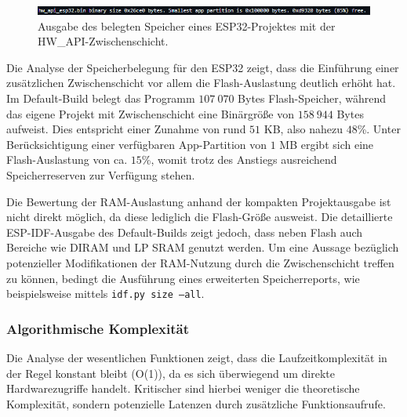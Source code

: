 \begin{figure}[H]
	\includegraphics[width=\textwidth]{Pics/esp32c6_hw_api_debug_size.png}
	\caption{Ausgabe des belegten Speicher eines ESP32-Projektes mit der HW\_API-Zwischenschicht.}
	\label{fig:esp32_hw_api_size}
\end{figure}

Die Analyse der Speicherbelegung für den ESP32 zeigt, dass die Einführung einer zusätzlichen Zwischenschicht vor allem die Flash-Auslastung deutlich erhöht hat. 
Im Default-Build belegt das Programm $107\ 070$ Bytes Flash-Speicher, während das eigene Projekt mit Zwischenschicht eine Binärgröße von $158\ 944$ Bytes aufweist. 
Dies entspricht einer Zunahme von rund $51$ KB, also nahezu $48$\%. Unter Berücksichtigung einer verfügbaren App-Partition von $1$ MB ergibt sich eine Flash-Auslastung von ca. $15$\%, womit trotz des Anstiegs ausreichend Speicherreserven zur Verfügung stehen.

Die Bewertung der RAM-Auslastung anhand der kompakten Projektausgabe ist nicht direkt möglich, da diese lediglich die Flash-Größe ausweist. 
Die detaillierte ESP-IDF-Ausgabe des Default-Builds zeigt jedoch, dass neben Flash auch Bereiche wie DIRAM und LP SRAM genutzt werden. 
Um eine Aussage bezüglich potenzieller Modifikationen der RAM-Nutzung durch die Zwischenschicht treffen zu können, bedingt die Ausführung eines erweiterten Speicherreports, wie beispielsweise mittels \texttt{idf.py size --all}.

%

\subsubsection{Algorithmische Komplexität}
Die Analyse der wesentlichen Funktionen zeigt, dass die Laufzeitkomplexität in der Regel konstant bleibt (O(1)), da es sich überwiegend um direkte Hardwarezugriffe handelt. Kritischer sind hierbei weniger die theoretische Komplexität, sondern potenzielle Latenzen durch zusätzliche Funktionsaufrufe.

